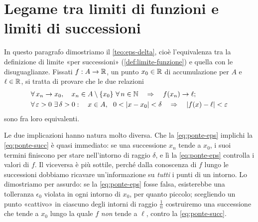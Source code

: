 \section{Legame tra limiti di funzioni e limiti di successioni}
\label{sec:legame-successioni}

In questo paragrafo dimostriamo il \cref{teo:eps-delta}, cioè l'equivalenza tra la
definizione di limite «per successioni» (\cref{def:limite-funzione}) e quella con le
disuguaglianze. Fissati $f:A\to\mathbb{R}$, un punto $x_{0}\in\mathbb{R}$ di accumulazione per $A$ e
$\ell\in\mathbb{R}$, si tratta di provare che le due relazioni
\begin{align}
  &\perogni x_{n}\to x_{0},\quad x_{n}\in A\setminus\{x_{0}\}\ \perogni n\in\N
  \quad\implica\quad f(x_{n})\to\ell; \label{eq:ponte-succ}\\
  &\perogni\epsilon>0\ \esiste\delta>0 :\quad x\in A,\ \ 0<\abs{x-x_{0}}<\delta
  \quad\implica\quad \abs{f(x)-\ell}<\epsilon \label{eq:ponte-eps}
\end{align}
sono fra loro equivalenti.

\begin{schema}
\end{schema}

\begin{strategia}
Le due implicazioni hanno natura molto diversa. Che la \eqref{eq:ponte-eps} implichi la
\eqref{eq:ponte-succ} è quasi immediato: se una successione $x_{n}$ tende a $x_{0}$, i
suoi termini finiscono per stare nell'intorno di raggio $\delta$, e lì la
\eqref{eq:ponte-eps} controlla i valori di $f$. Il viceversa è più sottile, perché
dalla conoscenza di $f$ lungo le successioni dobbiamo ricavare un'informazione su
\emph{tutti} i punti di un intorno. Lo dimostriamo per assurdo: se la
\eqref{eq:ponte-eps} fosse falsa, esisterebbe una tolleranza $\epsilon_{0}$ violata in
ogni intorno di $x_{0}$, per quanto piccolo; scegliendo un punto «cattivo» in ciascuno
degli intorni di raggio $\frac1n$ costruiremo una successione che tende a $x_{0}$ lungo
la quale $f$ \emph{non} tende a $\ell$, contro la \eqref{eq:ponte-succ}.
\end{strategia}

